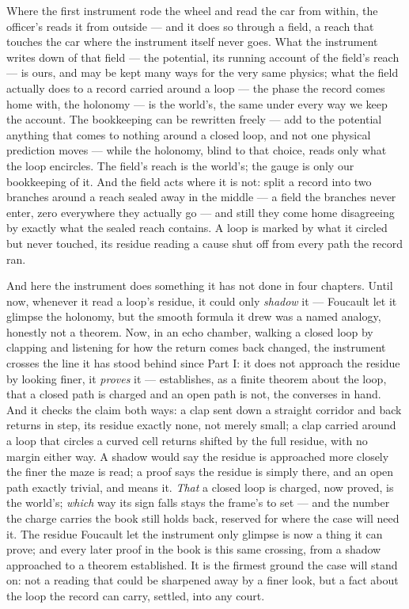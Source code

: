 Where the first instrument rode the wheel and read the car from within, the officer's reads it from outside ---
and it does so through a field, a reach that touches the car where the instrument itself never goes. What the
instrument writes down of that field --- the potential, its running account of the field's reach --- is ours,
and may be kept many ways for the very same physics; what the field actually does to a record carried around a
loop --- the phase the record comes home with, the holonomy --- is the world's, the same under every way we
keep the account. The bookkeeping can be rewritten freely --- add to the potential anything that comes to
nothing around a closed loop, and not one physical prediction moves --- while the holonomy, blind to that
choice, reads only what the loop encircles. The field's reach is the world's; the gauge is only our bookkeeping
of it. And the field acts where it is not: split a record into two branches around a reach sealed away in the
middle --- a field the branches never enter, zero everywhere they actually go --- and still they come home
disagreeing by exactly what the sealed reach contains. A loop is marked by what it circled but never touched,
its residue reading a cause shut off from every path the record ran.

And here the instrument does something it has not done in four chapters. Until now, whenever it read a loop's
residue, it could only \emph{shadow} it --- Foucault let it glimpse the holonomy, but the smooth formula it
drew was a named analogy, honestly not a theorem. Now, in an echo chamber, walking a closed loop by clapping
and listening for how the return comes back changed, the instrument crosses the line it has stood behind since
Part I: it does not approach the residue by looking finer, it \emph{proves} it --- establishes, as a finite
theorem about the loop, that a closed path is charged and an open path is not, the converses in hand. And it
checks the claim both ways: a clap sent down a straight corridor and back returns in step, its residue exactly
none, not merely small; a clap carried around a loop that circles a curved cell returns shifted by the full
residue, with no margin either way. A shadow would say the residue is approached more closely the finer the
maze is read; a proof says the residue is simply there, and an open path exactly trivial, and means it. \emph{That}
a closed loop is charged, now proved, is the world's; \emph{which} way its sign falls stays the frame's to set
--- and the number the charge carries the book still holds back, reserved for where the case will need it. The
residue Foucault let the instrument only glimpse is now a thing it can prove; and every later proof in the book
is this same crossing, from a shadow approached to a theorem established. It is the firmest
ground the case will stand on: not a reading that could be sharpened away by a finer look, but a fact about the
loop the record can carry, settled, into any court.

